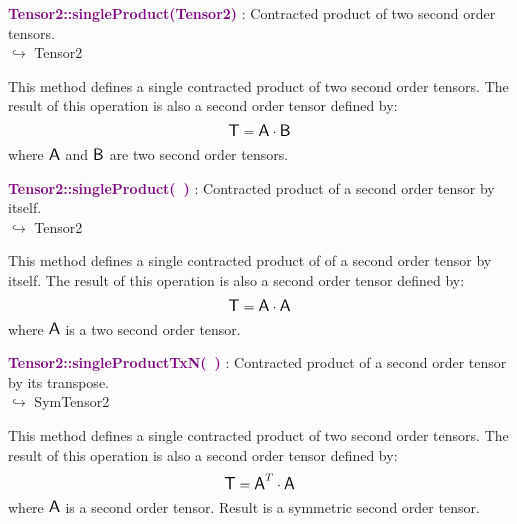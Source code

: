 \textcolor{purple}{\textbf{Tensor2::singleProduct(Tensor2)}}\label{Tensor2::singleProduct(Tensor2)} : Contracted product of two second order tensors.\\ \hspace*{5mm}$\hookrightarrow$ Tensor2

This method defines a single contracted product of two second order tensors.
The result of this operation is also a second order tensor defined by:
\begin{equation*}
\mbox{\large\ensuremath{\mathsf{T}}} = \mbox{\large\ensuremath{\mathsf{A}}} \cdot \mbox{\large\ensuremath{\mathsf{B}}}
\end{equation*}
where $\mbox{\large\ensuremath{\mathsf{A}}}$ and $\mbox{\large\ensuremath{\mathsf{B}}}$ are two second order tensors.

\textcolor{purple}{\textbf{Tensor2::singleProduct(~)}}\label{Tensor2::singleProduct()} : Contracted product of a second order tensor by itself.\\ \hspace*{5mm}$\hookrightarrow$ Tensor2

This method defines a single contracted product of of a second order tensor by itself.
The result of this operation is also a second order tensor defined by:
\begin{equation*}
\mbox{\large\ensuremath{\mathsf{T}}} = \mbox{\large\ensuremath{\mathsf{A}}} \cdot \mbox{\large\ensuremath{\mathsf{A}}}
\end{equation*}
where $\mbox{\large\ensuremath{\mathsf{A}}}$ is a two second order tensor.

\textcolor{purple}{\textbf{Tensor2::singleProductTxN(~)}}\label{Tensor2::singleProductTxN()} : Contracted product of a second order tensor by its transpose.\\ \hspace*{5mm}$\hookrightarrow$ SymTensor2

This method defines a single contracted product of two second order tensors.
The result of this operation is also a second order tensor defined by:
\begin{equation*}
\mbox{\large\ensuremath{\mathsf{T}}} = \mbox{\large\ensuremath{\mathsf{A}}}^T\cdot \mbox{\large\ensuremath{\mathsf{A}}}
\end{equation*}
where $\mbox{\large\ensuremath{\mathsf{A}}}$ is a second order tensor. Result is a symmetric second order tensor.


